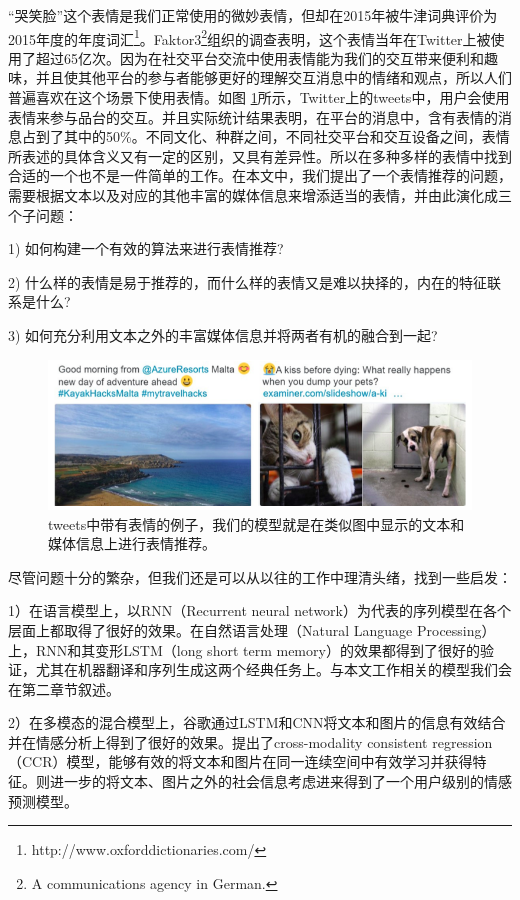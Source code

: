 \documentclass[10pt, titlepage]{article}
\begin{document}
“哭笑脸”这个表情是我们正常使用的微妙表情，但却在2015年被牛津词典评价为2015年度的年度词汇\footnote{http://www.oxforddictionaries.com/}。Faktor3\footnote{A communications agency in German.}组织的调查表明，这个表情当年在Twitter上被使用了超过65亿次。因为在社交平台交流中使用表情能为我们的交互带来便利和趣味，并且使其他平台的参与者能够更好的理解交互消息中的情绪和观点，所以人们普遍喜欢在这个场景下使用表情。如图 \ref{fig:twitter}所示，Twitter上的tweets中，用户会使用表情来参与品台的交互。并且实际统计结果表明\cite{dimson2015emojineering}，在平台的消息中，含有表情的消息占到了其中的50\%。不同文化、种群之间，不同社交平台和交互设备之间，表情所表述的具体含义又有一定的区别，又具有差异性。所以在多种多样的表情中找到合适的一个也不是一件简单的工作。在本文中，我们提出了一个表情推荐的问题，需要根据文本以及对应的其他丰富的媒体信息来增添适当的表情，并由此演化成三个子问题：

1) 如何构建一个有效的算法来进行表情推荐? 

2) 什么样的表情是易于推荐的，而什么样的表情又是难以抉择的，内在的特征联系是什么? 

3) 如何充分利用文本之外的丰富媒体信息并将两者有机的融合到一起?



\begin{figure}[htb]
\centering
\includegraphics[width=1\columnwidth]{figs/figure1.png}
\caption{tweets中带有表情的例子，我们的模型就是在类似图中显示的文本和媒体信息上进行表情推荐。}
\label{fig:twitter}
\end{figure}


尽管问题十分的繁杂，但我们还是可以从以往的工作中理清头绪，找到一些启发： 


1）在语言模型上，以RNN（Recurrent neural network）为代表的序列模型在各个层面上都取得了很好的效果。在自然语言处理（Natural Language Processing）上，RNN和其变形LSTM（long short term memory）的效果都得到了很好的验证，尤其在机器翻译\cite{cho2014learning}和序列生成\cite{zaremba2014recurrent}这两个经典任务上。与本文工作相关的模型我们会在第二章节叙述。

2）在多模态的混合模型上，谷歌\cite{cao2014cross}通过LSTM和CNN将文本和图片的信息有效结合并在情感分析上得到了很好的效果。\cite{clinchant2011semantic}提出了cross-modality consistent regression（CCR）模型，能够有效的将文本和图片在同一连续空间中有效学习并获得特征。\cite{yang2013user}则进一步的将文本、图片之外的社会信息考虑进来得到了一个用户级别的情感预测模型。
\end{document}

